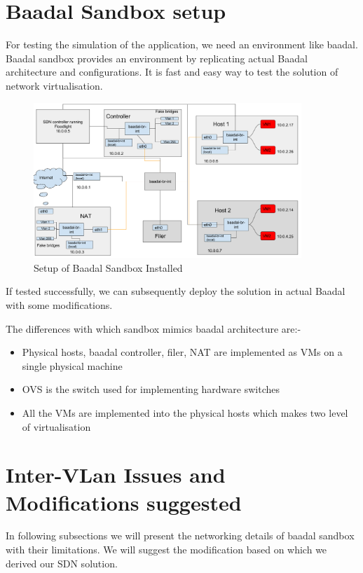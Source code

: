\section{Baadal Sandbox setup}
For testing the simulation of the application, we need an environment like baadal. Baadal sandbox provides an environment by replicating actual Baadal architecture and configurations. It is fast and easy way to test the solution of network virtualisation. 



\begin{figure}[h]
\caption{Setup of Baadal Sandbox Installed }
\centering
\includegraphics[width=0.9\textwidth]{baadal_networking_diagram}
\end{figure}

If tested successfully, we can subsequently deploy the solution in actual Baadal with some modifications.

The differences with which sandbox mimics baadal architecture are:-

\begin{itemize}
    \item Physical hosts, baadal controller, filer, NAT are implemented as VMs on a single physical machine
    \item OVS is the switch used for implementing hardware switches
    \item All the VMs are implemented into the physical hosts which makes two level of virtualisation
\end{itemize}



\section{Inter-VLan Issues and Modifications suggested}
In following subsections we will present the networking details of baadal sandbox with their limitations. We will suggest the modification based on which we derived our SDN solution. 

